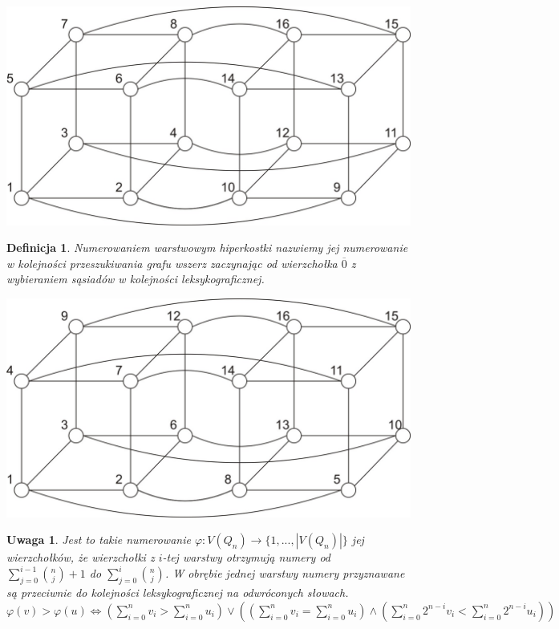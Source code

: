 \documentclass{pracamgr}
\newtheorem{defi}{Definicja}[section]
\newtheorem{remark}[theorem]{Uwaga}
\begin{document}
  \begin{center}
   \includegraphics[scale=0.6]{Q_4(klasyczne).jpg}
  \end{center}
  \begin{defi}\label{numerowanie warstwowe}%
  \emph{Numerowaniem warstwowym} hiperkostki nazwiemy jej numerowanie w kolejności przeszukiwania grafu wszerz zaczynając od wierzchołka $\overline{0}$
  z wybieraniem sąsiadów w kolejności leksykograficznej.
  \end{defi}
  \begin{center}
   \includegraphics[scale=0.6]{Q_4(warstwowe).jpg}
  \end{center}   
  \begin{remark}\label{numerowanie warstwowe 2}
   Jest to takie numerowanie $\varphi:V(Q_n)\rightarrow\{1,...,|V(Q_n)|\}$ jej wierzchołków,
   że wierzchołki z $i$-tej warstwy otrzymują numery od $\sum_{j=0}^{i-1}{n\choose j}+1$ do $\sum_{j=0}^{i}{n\choose j}$.
   W obrębie jednej warstwy numery przyznawane są przeciwnie do kolejności leksykograficznej na odwróconych słowach.
   $\varphi(v)>\varphi(u)\Leftrightarrow (\sum_{i=0}^n v_i>\sum_{i=0}^n u_i)
   \vee((\sum_{i=0}^n v_i=\sum_{i=0}^n u_i)\wedge(\sum_{i=0}^n2^{n-i}v_i<\sum_{i=0}^n2^{n-i}u_i))$
  \end{remark}
\end{document}
